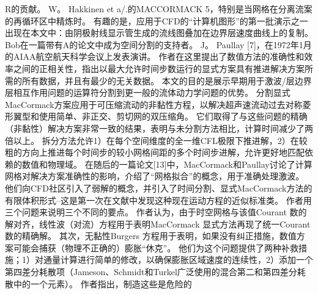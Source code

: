 \documentclass[UTF8,11pt,a4paper,openany,fontset=fandol]{ctexbook}
\begin{document}
R的贡献。 W。 Hakkinen et a/.的MACCORMACK 5，特别是当网格在分离流案的再循环区中精炼时。 有趣的是，应用于CFD的“计算机图形”的第一批演示之一出现在本文中：由阴极射线显示管生成的流线图叠加在边界层速度曲线上的复制。 Bob在一篇带有A的论文中成为空间分割的支持者。 J。 Paullay [7]，在1972年1月的AIAA航空航天科学会议上发表演讲。 作者在这里提出了数值方法的准确性和效率之间的正相关性，指出以最大允许时间步数运行的显式方案具有推进解决方案所需的所有数据，并且有最少的无关数据。 本文的目的是展示早期用于激波/层边界层相互作用问题的运算符分割到更一般的流体动力学问题的优势。 分割显式MacCormack方案应用于可压缩流动的非黏性方程，以解决超声速流动过去对称菱形翼型和使用简单、非正交、剪切网的双压缩角。 它们取得了与这些问题的精确（非黏性）解决方案非常一致的结果，表明与未分割方法相比，计算时间减少了两倍以上。 拆分方法允许1）在每个空间维度的全一维CFL极限下推进解，2）在较粗的方向上推进每个时间步的较小网格间距的多个时间步进解，允许更好地匹配依赖的数值和物理域。 在随后的一篇论文[13]中，MacCormack和Paullay讨论了计算网格对解决方案准确性的影响，介绍了“网格拟合”的概念，用于准确处理激波。 他们向CFD社区引入了弱解的概念，并引入了时间分割、显式MacCormack方法的有限体积形式--这是第一次在文献中发现这种现在运动方程的近似标准类。 作者用三个问题来说明三个不同的要点。 作者认为，由于时空网格与该值Courant 数的解对齐，线性波（对流）方程用于表明MacCormack 显式方法再现了统一Courant 数的精确解。 其次，无黏性Burgers 方程用于表明，如果没有纠正措施，数值方案可能会捕获（物理不正确的）膨胀“休克”。 他们为这个问题提供了两种补救措施；1）对通量计算进行简单的修改，以确保膨胀区域速度的连续性，2）添加一个第四差分耗散项（Jameson、Schmidt和Turkel广泛使用的混合第二和第四差分耗散中的一个元素）。 作者指出，制造这些是危险的
\end{document}
